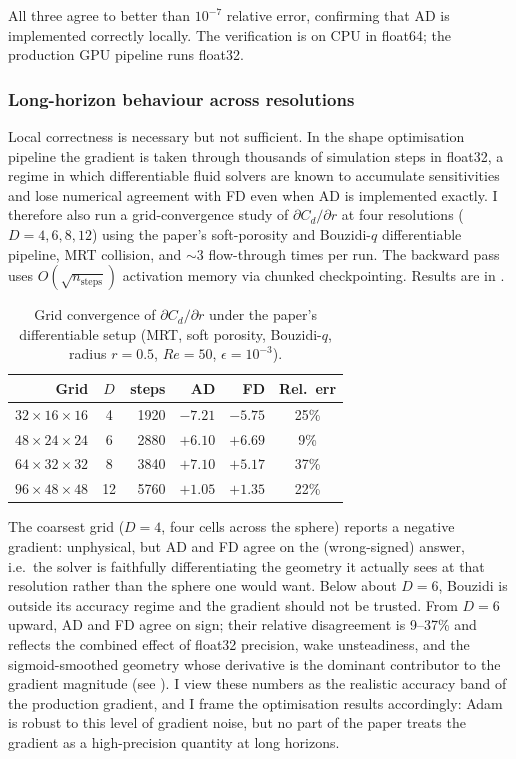 \documentclass[10pt,twocolumn]{article}
\begin{document}
All three agree to better than $10^{-7}$ relative error, confirming
that AD is implemented correctly locally. The verification is on CPU
in float64; the production GPU pipeline runs float32.

\subsubsection{Long-horizon behaviour across resolutions}
\label{sec:grad_convergence}

Local correctness is necessary but not sufficient. In the shape
optimisation pipeline the gradient is taken through thousands of
simulation steps in float32, a regime in which differentiable fluid
solvers are known to accumulate sensitivities and lose numerical
agreement with FD even when AD is implemented exactly. I therefore
also run a grid-convergence study of $\partial C_d / \partial r$ at
four resolutions ($D = 4, 6, 8, 12$) using the paper's soft-porosity
and Bouzidi-$q$ differentiable pipeline, MRT collision, and
${\sim}3$ flow-through times per run. The backward pass uses
$O(\sqrt{n_{\text{steps}}})$ activation memory via chunked
checkpointing. Results are in .

\begin{table}[t]
\centering
\caption{Grid convergence of $\partial C_d / \partial r$ under the
paper's differentiable setup (MRT, soft porosity, Bouzidi-$q$,
radius $r = 0.5$, $Re = 50$, $\epsilon = 10^{-3}$).}
\label{tab:grad_convergence}
\begin{tabular}{rcrrrc}
\toprule
Grid & $D$ & steps & AD & FD & Rel.\ err \\
\midrule
$32 \times 16 \times 16$ &  4 & 1920 & $-7.21$ & $-5.75$ & 25\% \\
$48 \times 24 \times 24$ &  6 & 2880 & $+6.10$ & $+6.69$ &  \phantom{0}9\% \\
$64 \times 32 \times 32$ &  8 & 3840 & $+7.10$ & $+5.17$ & 37\% \\
$96 \times 48 \times 48$ & 12 & 5760 & $+1.05$ & $+1.35$ & 22\% \\
\bottomrule
\end{tabular}
\end{table}

The coarsest grid ($D = 4$, four cells across the sphere) reports a
negative gradient: unphysical, but AD and FD agree on the
(wrong-signed) answer, i.e.\ the solver is faithfully differentiating
the geometry it actually sees at that resolution rather than the
sphere one would want. Below about $D = 6$, Bouzidi is outside its
accuracy regime and the gradient should not be trusted. From $D = 6$
upward, AD and FD agree on sign; their relative disagreement is 9--37\%
and reflects the combined effect of float32 precision, wake
unsteadiness, and the sigmoid-smoothed geometry whose derivative is
the dominant contributor to the gradient magnitude (see
). I view these numbers as the realistic
accuracy band of the production gradient, and I frame the
optimisation results accordingly: Adam is robust to this level of
gradient noise, but no part of the paper treats the gradient as a
high-precision quantity at long horizons.
\end{document}
